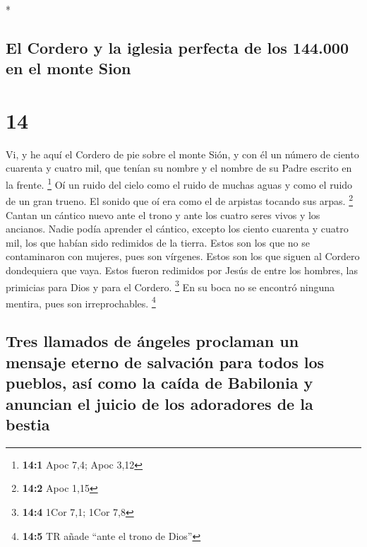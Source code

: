 \begin{paracol}{2}
\begin{otherlanguage}{english}
\end{otherlanguage}

\switchcolumn[0]*

\hypertarget{el-cordero-y-la-iglesia-perfecta-de-los-144.000-en-el-monte-sion}{%
\subsection{El Cordero y la iglesia perfecta de los 144.000 en el monte
Sion}\label{el-cordero-y-la-iglesia-perfecta-de-los-144.000-en-el-monte-sion}}

\hypertarget{section-26}{%
\section{14}\label{section-26}}

 Vi, y he aquí el Cordero de pie sobre el monte Sión, y
con él un número de ciento cuarenta y cuatro mil, que tenían su nombre y
el nombre de su Padre escrito en la frente. \footnote{\textbf{14:1} Apoc
  7,4; Apoc 3,12}  Oí un ruido del cielo como el ruido de
muchas aguas y como el ruido de un gran trueno. El sonido que oí era
como el de arpistas tocando sus arpas. \footnote{\textbf{14:2} Apoc 1,15}
 Cantan un cántico nuevo ante el trono y ante los cuatro
seres vivos y los ancianos. Nadie podía aprender el cántico, excepto los
ciento cuarenta y cuatro mil, los que habían sido redimidos de la
tierra.  Estos son los que no se contaminaron con mujeres,
pues son vírgenes. Estos son los que siguen al Cordero dondequiera que
vaya. Estos fueron redimidos por Jesús de entre los hombres, las
primicias para Dios y para el Cordero. \footnote{\textbf{14:4} 1Cor 7,1;
  1Cor 7,8}  En su boca no se encontró ninguna mentira,
pues son irreprochables. \footnote{\textbf{14:5} TR añade ``ante el
  trono de Dios''}

\hypertarget{tres-llamados-de-uxe1ngeles-proclaman-un-mensaje-eterno-de-salvaciuxf3n-para-todos-los-pueblos-asuxed-como-la-cauxedda-de-babilonia-y-anuncian-el-juicio-de-los-adoradores-de-la-bestia}{%
\subsection{Tres llamados de ángeles proclaman un mensaje eterno de
salvación para todos los pueblos, así como la caída de Babilonia y
anuncian el juicio de los adoradores de la
bestia}\label{tres-llamados-de-uxe1ngeles-proclaman-un-mensaje-eterno-de-salvaciuxf3n-para-todos-los-pueblos-asuxed-como-la-cauxedda-de-babilonia-y-anuncian-el-juicio-de-los-adoradores-de-la-bestia}}


\end{paracol}
